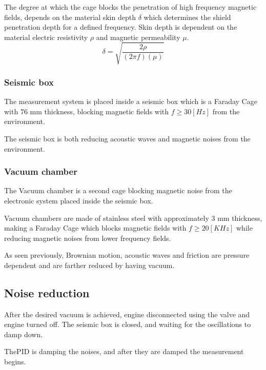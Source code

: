 \documentclass[\main/master.tex]{subfiles}
\begin{document}
\par\noindent
The degree at which the cage blocks the penetration of high frequency magnetic fields, depends on the material skin depth $\delta$ which determines the shield penetration depth for a defined frequency. Skin depth is dependent on the material electric resistivity $\rho$ and magnetic permeability $\mu$. 
\begin{equation}
\delta = \sqrt{\frac{2\rho}{(2\pi f)(\mu)} }    \label{eqn:skin depth}
\end{equation}

\subsubsection{Seismic box}
The measurement system is placed inside a seismic box which is a Faraday Cage with 76 mm thickness, blocking magnetic fields with $f \ge 30 [Hz]$ from the environment.
\par\noindent
The seismic box is both reducing acoustic waves and magnetic noises from the environment.
\subsubsection{Vacuum chamber}
The Vacuum chamber is a second cage blocking magnetic noise from the electronic system placed inside the seismic box.
\par\noindent
Vacuum chambers are made of stainless steel with approximately 3 mm thickness, making a Faraday Cage which blocks magnetic fields with $f\ge 20 [KHz]$ while reducing magnetic noises from lower frequency fields.
\par\noindent
As seen previously, Brownian motion, acoustic waves and friction are pressure dependent and are farther reduced by having vacuum.

\subsection{Noise reduction}
\par\noindent
After the desired vacuum is achieved, engine disconnected using the valve and engine turned off. The seismic box is closed, and waiting for the oscillations to damp down.


\par\noindent
ThePID is damping the noises, and after they are damped the measurement begins.
\end{document}
